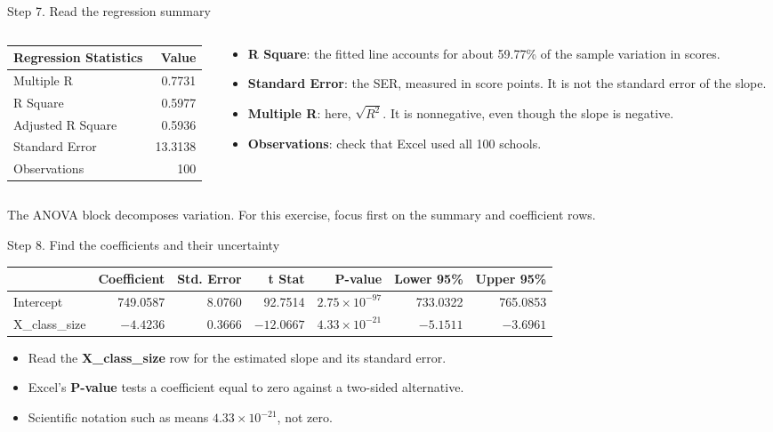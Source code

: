 \documentclass[notes,10pt,aspectratio=169]{beamer}
\newcommand{\xl}[1]{{\small\texttt{\detokenize{#1}}}}
\begin{document}
\begin{frame}{Step 7. Read the regression summary}
\begin{columns}[T]
\begin{column}{.40\textwidth}
\begin{tabular}{lr}
\toprule
Regression Statistics & Value\\
\midrule
Multiple R & 0.7731\\
R Square & 0.5977\\
Adjusted R Square & 0.5936\\
Standard Error & 13.3138\\
Observations & 100\\
\bottomrule
\end{tabular}
\end{column}
\begin{column}{.56\textwidth}
\begin{itemize}
\setlength{\itemsep}{7pt}
\item \textbf{R Square}: the fitted line accounts for about 59.77\% of the sample variation in scores.
\item \textbf{Standard Error}: the SER, measured in score points. It is not the standard error of the slope.
\item \textbf{Multiple R}: here, $\sqrt{R^2}$. It is nonnegative, even though the slope is negative.
\item \textbf{Observations}: check that Excel used all 100 schools.
\end{itemize}
\end{column}
\end{columns}
\vspace{8pt}
The ANOVA block decomposes variation. For this exercise, focus first on the summary and coefficient rows.
\end{frame}

\begin{frame}{Step 8. Find the coefficients and their uncertainty}
\begin{center}
\small
\begin{tabular}{lrrrrrr}
\toprule
 & Coefficient & Std. Error & t Stat & P-value & Lower 95\% & Upper 95\%\\
\midrule
Intercept & 749.0587 & 8.0760 & 92.7514 & $2.75\!\times\!10^{-97}$ & 733.0322 & 765.0853\\
X\_class\_size & $-4.4236$ & 0.3666 & $-12.0667$ & $4.33\!\times\!10^{-21}$ & $-5.1511$ & $-3.6961$\\
\bottomrule
\end{tabular}
\end{center}
\begin{itemize}
\setlength{\itemsep}{8pt}
\item Read the \textbf{X\_class\_size} row for the estimated slope and its standard error.
\item Excel's \textbf{P-value} tests a coefficient equal to zero against a two-sided alternative.
\item Scientific notation such as \xl{4.33E-21} means $4.33\times10^{-21}$, not zero.
\end{itemize}
\end{frame}
\end{document}
